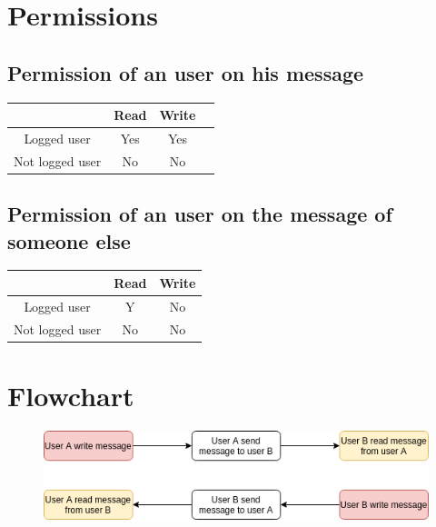 \documentclass[11pt]{article}
\begin{document}
\section{Permissions}

\subsection{Permission of an user on his \textbf{message}}

\begin{table}[!htb]
	\centering
	\begin{tabular}{|c|c|c|c|}
		\hline
		& Read & Write \\  [0.5ex]
		\hline 
		Logged user & Yes & Yes \\ 
		\hline 
		Not logged user & No & No \\ 
		\hline 
	\end{tabular} 
    \label{table:nonlin}
\end{table}

\subsection{Permission of an user on the \textbf{message} of someone else}

\begin{table}[!hbt]
	\centering
	\begin{tabular}{|c|c|c|}
		\hline
		& Read & Write \\  [0.5ex]
		\hline 
		Logged user & Y & No \\ 
		\hline 
		Not logged user & No & No \\ 
		\hline 
	\end{tabular} 
	\label{table:nonlin}
\end{table}

\section{Flowchart}

\begin{figure}[htp]
\centering
\includegraphics[scale=0.50]{images/whatever.png}
\caption{}
\label{}
\end{figure}
\end{document}
